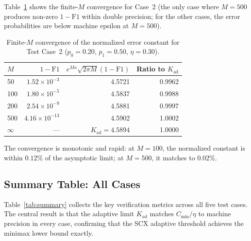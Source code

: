 Table~\ref{tab:finiteM} shows the finite-$M$ convergence for Case~2 (the only case where $M=500$ produces non-zero $1-\mathrm{F1}$ within double precision; for the other cases, the error probabilities are below machine epsilon at $M=500$).

\begin{table}[htbp]
\centering
\caption{Finite-$M$ convergence of the normalized error constant for Test Case~2 ($p_0=0.20$, $p_1=0.50$, $\eta=0.30$).}
\label{tab:finiteM}
\begin{tabular}{lrrr}
\toprule
$M$ & $1 - \mathrm{F1}$ & $e^{M\kappa}\sqrt{2\pi M}(1-\mathrm{F1})$ & Ratio to $K_{\mathrm{ad}}$ \\
\midrule
50 & $1.52 \times 10^{-3}$ & 4.5721 & 0.9962 \\
100 & $1.80 \times 10^{-5}$ & 4.5837 & 0.9988 \\
200 & $2.54 \times 10^{-9}$ & 4.5881 & 0.9997 \\
500 & $4.16 \times 10^{-13}$ & 4.5902 & 1.0002 \\
$\infty$ & --- & $K_{\mathrm{ad}} = 4.5894$ & 1.0000 \\
\bottomrule
\end{tabular}
\end{table}

The convergence is monotonic and rapid: at $M=100$, the normalized constant is within $0.12\%$ of the asymptotic limit; at $M=500$, it matches to $0.02\%$.

\subsection{Summary Table: All Cases}

Table~\ref{tab:summary} collects the key verification metrics across all five test cases. The central result is that the adaptive limit $K_{\mathrm{ad}}$ matches $C_{\min}/\eta$ to machine precision in every case, confirming that the SCX adaptive threshold achieves the minimax lower bound exactly.


